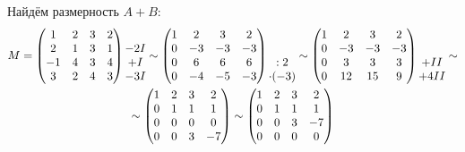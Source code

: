 Найдём размерность $ A + B $:
\begin{multline*}
    M =
    \begin{pmatrix}
        1 & 2 & 3 & 2 \\
        2 & 1 & 3 & 1 \\
        -1 & 4 & 3 & 4 \\
        3 & 2 & 4 & 3
    \end{pmatrix}
    \begin{matrix}
        \ \\
        -2\rom1 \\
        +\rom1 \\
        -3\rom1
    \end{matrix} \sim
    \begin{pmatrix}
        1 & 2 & 3 & 2 \\
        0 & -3 & -3 & -3 \\
        0 & 6 & 6 & 6 \\
        0 & -4 & -5 & -3
    \end{pmatrix}
    \begin{matrix}
        \ \\
        \ \\
        : 2 \\
        \cdot (-3)
    \end{matrix} \sim
    \begin{pmatrix}
        1 & 2 & 3 & 2 \\
        0 & -3 & -3 & -3 \\
        0 & 3 & 3 & 3 \\
        0 & 12 & 15 & 9
    \end{pmatrix}
    \begin{matrix}
    	\ \\
        \ \\
        +\rom2 \\
        +4\rom2
    \end{matrix} \sim \\
    \sim
    \begin{pmatrix}
    	1 & 2 & 3 & 2 \\
        0 & 1 & 1 & 1 \\
        0 & 0 & 0 & 0 \\
        0 & 0 & 3 & -7
    \end{pmatrix} \sim
    \begin{pmatrix}
    	1 & 2 & 3 & 2 \\
        0 & 1 & 1 & 1 \\
        0 & 0 & 3 & -7 \\
        0 & 0 & 0 & 0
    \end{pmatrix}
\end{multline*}
